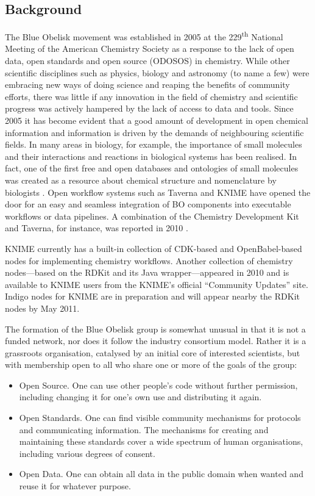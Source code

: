 \documentclass[10pt]{bmc_article}
\newenvironment{bmcformat}{\begin{raggedright}\baselineskip20pt\sloppy\setboolean{publ}{false}}{\end{raggedright}\baselineskip20pt\sloppy}
\begin{document}
\begin{bmcformat}
\section*{Background}
The Blue Obelisk movement was established in 2005 at the
229\textsuperscript{th} National Meeting of the American Chemistry
Society as a response to the lack of open data, open standards and
open source (ODOSOS) in chemistry. While other scientific disciplines
such as physics, biology and astronomy (to name a few) were embracing
new ways of doing science and reaping the benefits of community
efforts, there was little if any innovation in the field of chemistry
and scientific progress was actively hampered by the lack of access to
data and tools.
Since 2005 it has become evident that a good amount of development in open 
chemical information and information is driven by the demands of neighbouring
scientific fields. In many areas in biology, for example, the importance of 
small molecules and their interactions and reactions in biological systems
has been realised. In fact, one of the first free and open databases and ontologies 
of small molecules was created as a resource about chemical structure and nomenclature
by biologists \cite{DeMatos:2009p3839}.
Open workflow systems such as Taverna \cite{Hull:2006p60} and KNIME\cite{WebKNIME}
have opened the door for 
an easy and seamless integration of BO components into executable workflows 
or data pipelines. A combination of the Chemistry Development Kit and Taverna, for instance, was
reported in 2010 \cite{Kuhn:2010p4001}. 

KNIME currently has a built-in collection of CDK-based and
OpenBabel-based nodes\cite{WebKNIMEExtensions} for implementing
chemistry workflows. Another collection of chemistry nodes---based on
the RDKit and its Java wrapper---appeared in 2010 and is available to
KNIME users from the KNIME's official ``Community Updates'' site.
Indigo nodes for KNIME are in preparation and will appear nearby the
RDKit nodes by May 2011.

The formation of the Blue Obelisk group is somewhat unusual in that it
is not a funded network, nor does it follow the industry consortium
model. Rather it is a grassroots organisation, catalysed by an initial
core of interested scientists, but with membership open to all who
share one or more of the goals of the group:
\begin{itemize}
\item Open Source. One can use other people's code without further
permission, including changing it for one's own use and distributing
it again.
\item Open Standards. One can find visible community mechanisms for
protocols and communicating information. The mechanisms for creating
and maintaining these standards cover a wide spectrum of human
organisations, including various degrees of consent.
\item Open Data. One can obtain all data in the public domain when
wanted and reuse it for whatever purpose.
\end{itemize}


\end{bmcformat}
\end{document}
